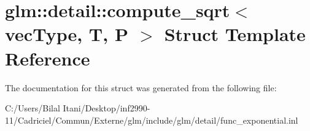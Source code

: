 \hypertarget{structglm_1_1detail_1_1compute__sqrt}{}\section{glm\+:\+:detail\+:\+:compute\+\_\+sqrt$<$ vec\+Type, T, P $>$ Struct Template Reference}
\label{structglm_1_1detail_1_1compute__sqrt}


The documentation for this struct was generated from the following file\+:\begin{DoxyCompactItemize}
\item 
C\+:/\+Users/\+Bilal Itani/\+Desktop/inf2990-\/11/\+Cadriciel/\+Commun/\+Externe/glm/include/glm/detail/func\+\_\+exponential.\+inl\end{DoxyCompactItemize}
